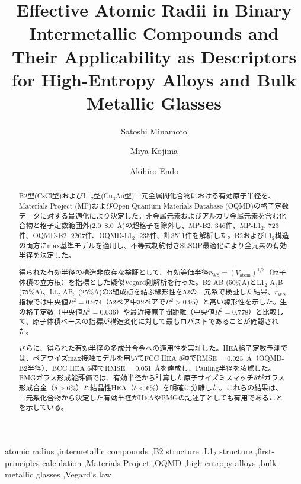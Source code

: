 \documentclass[a4paper,10pt,5p]{elsarticle}
\begin{document}
\begin{frontmatter}

\title{Effective Atomic Radii in Binary Intermetallic Compounds and Their Applicability as Descriptors for High-Entropy Alloys and Bulk Metallic Glasses}

\author[nims]{Satoshi Minamoto}
\author[nims]{Miya Kojima}  
\author[nims]{Akihiro Endo}




\begin{abstract}

B2型(CsCl型)およびL1$_2$型(Cu$_3$Au型)二元金属間化合物における有効原子半径を、Materials Project (MP)およびOpen Quantum Materials Database (OQMD)の格子定数データに対する最適化により決定した。非金属元素およびアルカリ金属元素を含む化合物と格子定数範囲外(2.0--8.0~\AA)の超格子を除外し、MP-B2: 346件、MP-L1$_2$: 723件、OQMD-B2: 2207件、OQMD-L1$_2$: 235件、計3511件を解析した。B2およびL1$_2$構造の両方にmax基準モデルを適用し、不等式制約付きSLSQP最適化により全元素の有効半径を決定した。

得られた有効半径の構造非依存な検証として、有効等価半径$r_\mathrm{WS} = (V_\mathrm{atom})^{1/3}$（原子体積の立方根）を指標とした疑似Vegard則解析を行った。B2 AB (50\%A)とL1$_2$ A$_3$B (75\%A)、L1$_2$ AB$_3$ (25\%A)の3組成点を結ぶ線形性を52の二元系で検証した結果、$r_\mathrm{WS}$指標では中央値$R^2 = 0.974$（52ペア中32ペアで$R^2 > 0.95$）と高い線形性を示した。生の格子定数（中央値$R^2 = 0.036$）や最近接原子間距離（中央値$R^2 = 0.778$）と比較して、原子体積ベースの指標が構造変化に対して最もロバストであることが確認された。

さらに、得られた有効半径の多成分合金への適用性を実証した。HEA格子定数予測では、ペアワイズmax接触モデルを用いてFCC HEA 8種でRMSE = 0.023~\AA（OQMD-B2半径）、BCC HEA 6種でRMSE = 0.051~\AA を達成し、Pauling半径を凌駕した。BMGガラス形成能評価では、有効半径から計算した原子サイズミスマッチ$\delta$がガラス形成合金（$\delta > 6$\%）と結晶性HEA（$\delta < 6$\%）を明確に分離した。これらの結果は、二元系化合物から決定した有効半径がHEAやBMGの記述子としても有用であることを示している。
\end{abstract}

\begin{keyword}
atomic radius \sep intermetallic compounds \sep B2 structure \sep L1$_2$ structure \sep first-principles calculation \sep Materials Project \sep OQMD \sep high-entropy alloys \sep bulk metallic glasses \sep Vegard's law
\end{keyword}

\end{frontmatter}
\end{document}
